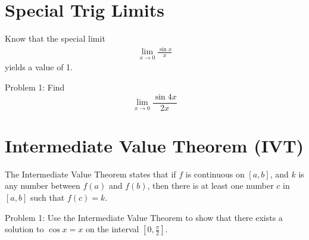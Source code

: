 \documentclass[../abcalc.tex]{subfiles}
\begin{document}
\section{Special Trig Limits}
Know that the special limit
\begin{align*}
\lim_{x\to 0}\frac{\sin x}{x}
\end{align*}
yields a value of 1.

Problem 1: Find
\[\lim_{x\to 0}\frac{\sin 4x}{2x}\]
\section{Intermediate Value Theorem (IVT)}
The Intermediate Value Theorem states that if $f$ is continuous on $[a,b]$, and $k$ is any number between $f(a)$ and $f(b)$, then there is at least one 
number $c$ in $[a,b]$ such that $f(c)=k$.

Problem 1: Use the Intermediate Value Theorem to show that there exists a solution to $\cos x = x$ on the interval $\left[0, \frac{\pi}{2}\right]$.
\end{document}
